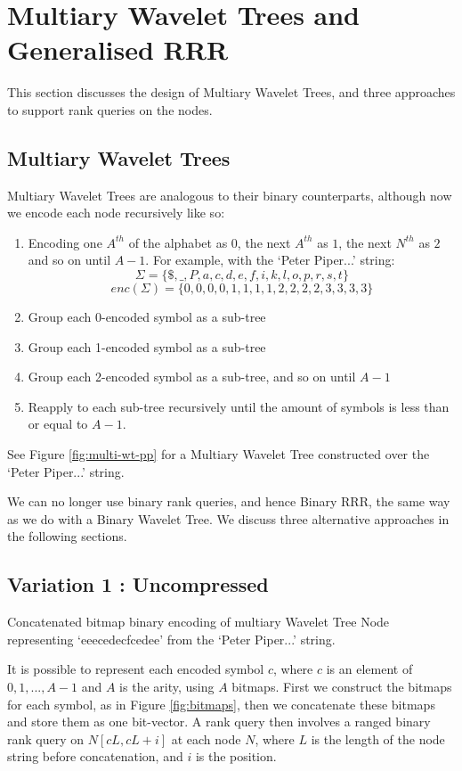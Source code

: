 \section{Multiary Wavelet Trees and Generalised RRR}
\label{sec:multiary}

This section discusses the design of Multiary Wavelet Trees, and three 
approaches to support rank queries on the nodes.

\subsection{Multiary Wavelet Trees}
Multiary Wavelet Trees are analogous to their binary counterparts, although now 
we encode each node recursively like so:

\begin{enumerate}
    \item Encoding one $A^{th}$ of the alphabet as $0$, the next $A^{th}$ as 
		$1$, the next $N^{th}$ as $2$ and so on until $A-1$. For example, with 
		the `Peter Piper...' string:
		$$\Sigma = \{ \$, \_, P, a, c, d, e, f, i, k, l, o, p, r, s, t \}$$
	   	$$enc(\Sigma) = \{  0,  0, 0, 0, 1, 1, 1, 1, 2, 2, 2, 2, 3, 3, 3, 3 \}$$
    \item Group each 0-encoded symbol as a sub-tree
    \item Group each 1-encoded symbol as a sub-tree
    \item Group each 2-encoded symbol as a sub-tree, and so on until $A-1$
    \item Reapply to each sub-tree recursively until the amount of symbols is
	less than or equal to $A - 1$.
\end{enumerate}

See Figure \ref{fig:multi-wt-pp} for a Multiary Wavelet Tree constructed over
the `Peter Piper...' string.

We can no longer use binary rank queries, and hence Binary RRR, the same way as 
we do with a Binary Wavelet Tree. We discuss three alternative approaches in the 
following sections.

\subsection{Variation 1 : Uncompressed}
		{Concatenated bitmap binary encoding of multiary Wavelet Tree Node
		representing `eeecedecfcedee' from the `Peter Piper...' string.}
		
It is possible to represent each encoded symbol $c$, where $c$ is an element of
${ 0, 1,..., A - 1}$ and $A$ is the arity, using $A$ bitmaps. First we construct
the bitmaps for each symbol, as in Figure \ref{fig:bitmaps}, then we concatenate 
these bitmaps and store them as one 
bit-vector. A rank query then involves a ranged binary rank query on $N[c L, c L 
+ i]$ at each node $N$, where $L$ is the length of the node string before 
concatenation, and $i$ is the position.

